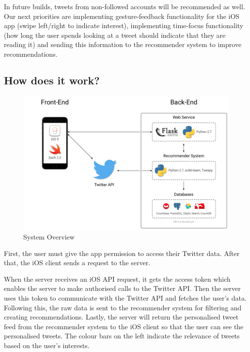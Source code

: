 \documentclass{article}
\begin{document}
In future builds, tweets from non-followed accounts will be recommended as well. Our next priorities are implementing gesture-feedback functionality for the iOS app (swipe left/right to indicate interest), implementing time-focus functionality (how long the user spends looking at a tweet should indicate that they are reading it) and sending this information to the recommender system to improve recommendations.

\subsection{How does it work?}

\begin{figure}[H]
    \centering
    \includegraphics[width=\textwidth]{system_overview}  
    \caption{System Overview}
\end{figure}


First, the user must give the app permission to access their Twitter data. After that, the iOS client sends a request to the server.

When the server receives an iOS API request, it gets the access token which enables the server to make authorised calls to the Twitter API. Then the server uses this token to communicate with the Twitter API and fetches the user's data. Following this, the raw data is sent to the recommender system for filtering and creating recommendations. 
Lastly, the server will return the personalised tweet feed from the recommender system to the iOS client so that the user can see the personalised tweets. The colour bars on the left indicate the relevance of tweets based on the user's interests.
\end{document}

